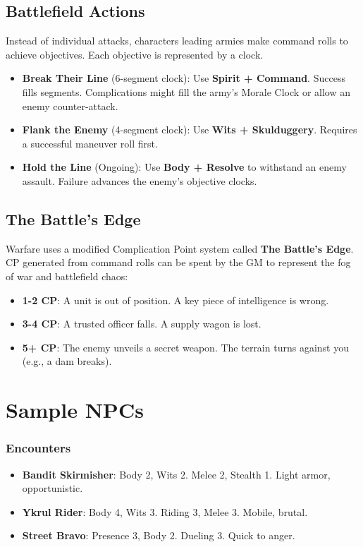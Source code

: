\subsection*{Battlefield Actions}

Instead of individual attacks, characters leading armies make command rolls to achieve objectives. Each objective is represented by a clock.
\begin{itemize}
    \item \textbf{Break Their Line} (6-segment clock): Use \textbf{Spirit + Command}. Success fills segments. Complications might fill the army's Morale Clock or allow an enemy counter-attack.
    \item \textbf{Flank the Enemy} (4-segment clock): Use \textbf{Wits + Skulduggery}. Requires a successful maneuver roll first.
    \item \textbf{Hold the Line} (Ongoing): Use \textbf{Body + Resolve} to withstand an enemy assault. Failure advances the enemy's objective clocks.
\end{itemize}

\subsection*{The Battle's Edge}

Warfare uses a modified Complication Point system called \textbf{The Battle's Edge}. CP generated from command rolls can be spent by the GM to represent the fog of war and battlefield chaos:
\begin{itemize}
    \item \textbf{1-2 CP}: A unit is out of position. A key piece of intelligence is wrong.
    \item \textbf{3-4 CP}: A trusted officer falls. A supply wagon is lost.
    \item \textbf{5+ CP}: The enemy unveils a secret weapon. The terrain turns against you (e.g., a dam breaks).
\end{itemize}

\section*{Sample NPCs}

\subsubsection*{Encounters}

\begin{itemize}
    \item \textbf{Bandit Skirmisher}: Body 2, Wits 2. Melee 2, Stealth 1. Light armor, opportunistic.
    \item \textbf{Ykrul Rider}: Body 4, Wits 3. Riding 3, Melee 3. Mobile, brutal.
    \item \textbf{Street Bravo}: Presence 3, Body 2. Dueling 3. Quick to anger.
\end{itemize}


